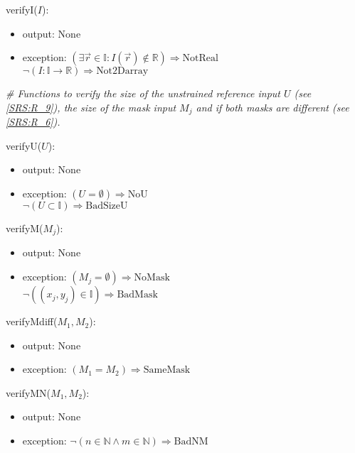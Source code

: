 \documentclass[12pt, titlepage]{article}
\begin{document}
\noindent verifyI($I$):
\begin{itemize}
\item output: None
\item exception:\newline
$(\exists \vec{r} \in \mathbb{I}: I(\vec{r}) \notin \mathbb{R}) \Rightarrow 
\text{NotReal}$\\
$\neg(I:\mathbb{I} \rightarrow \mathbb{R})\Rightarrow \text{Not2Darray}$
\end{itemize}
\bigskip

\noindent\textit{{\#} Functions to verify the size of the unstrained reference 
input $U$ (see \cref{SRS:R_9}), the size of the mask input $M_j$ and if both 
masks are different (see \cref{SRS:R_6}).}
\medskip

\noindent verifyU($U$):
\begin{itemize}
\item output: None
\item exception:\newline
$(U=\emptyset)\Rightarrow\text{NoU}$\\
$\neg (U \subset \mathbb{I}) \Rightarrow \text{BadSizeU}$
\end{itemize}
\bigskip

\noindent verifyM($M_j$):
\begin{itemize}
\item output: None
\item exception:\newline
$(M_j=\emptyset)\Rightarrow\text{NoMask}$\\
$\neg((x_j,y_j) \in \mathbb{I})\Rightarrow \text{BadMask}$\\
\end{itemize}
\bigskip

\noindent verifyMdiff($M_1,M_2$):
\begin{itemize}
\item output: None
\item exception:\newline
$(M_1=M_2)\Rightarrow\text{SameMask}$
\end{itemize}
\bigskip

\noindent verifyMN($M_1,M_2$):
\begin{itemize}
\item output: None
\item exception:\newline
$\neg (n \in \mathbb{N} \wedge m \in \mathbb{N}) \Rightarrow \text{BadNM}$
\end{itemize}
\end{document}
